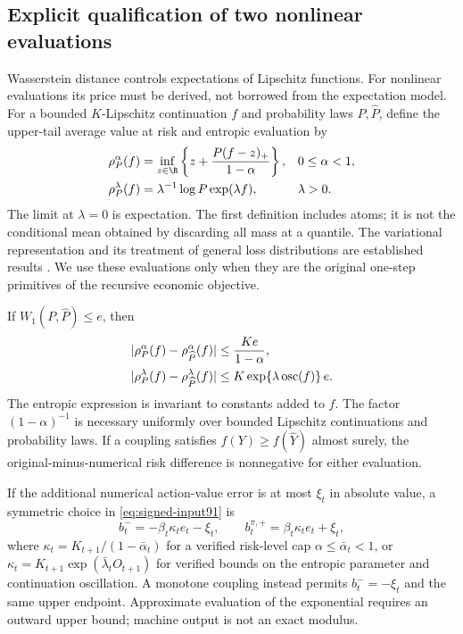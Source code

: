 \subsection{Explicit qualification of two nonlinear evaluations}
Wasserstein distance controls expectations of Lipschitz functions. For nonlinear evaluations its price must be derived, not borrowed from the expectation model. For a bounded $K$-Lipschitz continuation $f$ and probability laws $P,\widehat P$, define the upper-tail average value at risk and entropic evaluation by
\begin{align}\label{eq:risk-definitions91}
 \rho^\alpha_P(f)&=\inf_{z\in\R}
       \left\{z+\frac{P(f-z)_+}{1-\alpha}\right\},
       &&0\le\alpha<1,\notag\\
 \rho^\lambda_P(f)&=\lambda^{-1}\log P\exp(\lambda f),
       &&\lambda>0.
\end{align}
The limit at $\lambda=0$ is expectation. The first definition includes atoms; it is not the conditional mean obtained by discarding all mass at a quantile. The variational representation and its treatment of general loss distributions are established results \citep{rockafellaruryasev2002}. We use these evaluations only when they are the original one-step primitives of the recursive economic objective.

\begin{proposition}\label{prop:risk-transport91}
If $W_1(P,\widehat P)\le e$, then
\begin{align}\label{eq:risk-moduli91}
 |\rho^\alpha_P(f)-\rho^\alpha_{\widehat P}(f)|
       &\le \frac{K e}{1-\alpha},\notag\\
 |\rho^\lambda_P(f)-\rho^\lambda_{\widehat P}(f)|
       &\le K\exp\{\lambda\operatorname{osc}(f)\}\,e.
\end{align}
The entropic expression is invariant to constants added to $f$. The factor $(1-\alpha)^{-1}$ is necessary uniformly over bounded Lipschitz continuations and probability laws. If a coupling satisfies $f(Y)\ge f(\widehat Y)$ almost surely, the original-minus-numerical risk difference is nonnegative for either evaluation.
\end{proposition}

If the additional numerical action-value error is at most $\xi_t$ in absolute value, a symmetric choice in \eqref{eq:signed-input91} is
\[
 b^-_t=-\beta_t\kappa_t e_t-\xi_t,
 \qquad b^{\pi,+}_t=\beta_t\kappa_t e_t+\xi_t,
\]
where $\kappa_t=K_{t+1}/(1-\bar\alpha_t)$ for a verified risk-level cap $\alpha\le\bar\alpha_t<1$, or $\kappa_t=K_{t+1}\exp(\bar\lambda_t O_{t+1})$ for verified bounds on the entropic parameter and continuation oscillation. A monotone coupling instead permits $b^-_t=-\xi_t$ and the same upper endpoint. Approximate evaluation of the exponential requires an outward upper bound; machine output is not an exact modulus.

